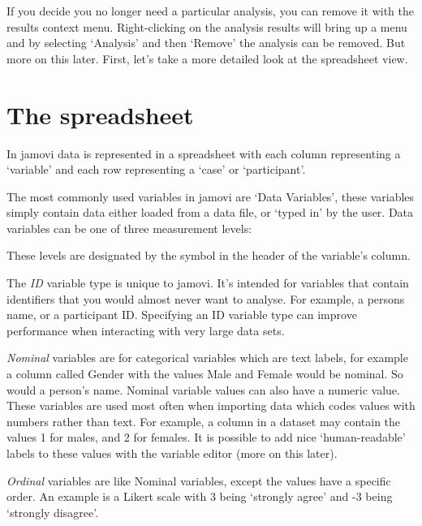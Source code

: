 If you decide you no longer need a particular analysis, you can remove it with the results context menu. Right-clicking on the analysis results will bring up a menu and by selecting ‘Analysis’ and then ‘Remove’ the analysis can be removed. But more on this later. First, let's take a more detailed look at the spreadsheet view.


\section{The spreadsheet\label{sec:spreadsheet}}

In jamovi data is represented in a spreadsheet with each column representing a ‘variable’ and each row representing a ‘case’ or ‘participant’.


The most commonly used variables in jamovi are ‘Data Variables’, these variables simply contain data either loaded from a data file, or ‘typed in’ by the user. Data variables can be one of three measurement levels:

\begin{figure}[ht]
\end{figure}

These levels are designated by the symbol in the header of the variable’s column.

The {\it ID} variable type is unique to jamovi. It’s intended for variables that contain identifiers that you would almost never want to analyse. For example, a persons name, or a participant ID. Specifying an ID variable type can improve performance when interacting with very large data sets.

{\it Nominal} variables are for categorical variables which are text labels, for example a column called Gender with the values Male and Female would be nominal. So would a person’s name. Nominal variable values can also have a numeric value. These variables are used most often when importing data which codes values with numbers rather than text. For example, a column in a dataset may contain the values 1 for males, and 2 for females. It is possible to add nice ‘human-readable’ labels to these values with the variable editor (more on this later).

{\it Ordinal} variables are like Nominal variables, except the values have a specific order. An example is a Likert scale with 3 being ‘strongly agree’ and -3 being ‘strongly disagree’.

